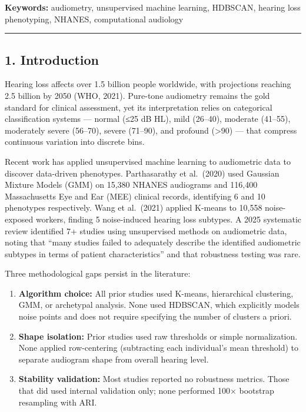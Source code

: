 \documentclass[
]{article}
\newcounter{none} %
\begin{document}
\textbf{Keywords:} audiometry, unsupervised machine learning, HDBSCAN, hearing
loss phenotyping, NHANES, computational audiology

\begin{center}\rule{0.5\linewidth}{0.5pt}\end{center}

\subsection{1. Introduction}\label{introduction}

Hearing loss affects over 1.5 billion people worldwide, with projections
reaching 2.5 billion by 2050 (WHO, 2021). Pure-tone audiometry remains the gold
standard for clinical assessment, yet its interpretation relies on categorical
classification systems --- normal (≤25 dB HL), mild (26--40), moderate (41--55),
moderately severe (56--70), severe (71--90), and profound (\textgreater90) ---
that compress continuous variation into discrete bins.

Recent work has applied unsupervised machine learning to audiometric data to
discover data-driven phenotypes. Parthasarathy et al.~(2020) used Gaussian
Mixture Models (GMM) on 15,380 NHANES audiograms and 116,400 Massachusetts Eye
and Ear (MEE) clinical records, identifying 6 and 10 phenotypes respectively.
Wang et al.~(2021) applied K-means to 10,558 noise-exposed workers, finding 5
noise-induced hearing loss subtypes. A 2025 systematic review identified 7+
studies using unsupervised methods on audiometric data, noting that ``many
studies failed to adequately describe the identified audiometric subtypes in
terms of patient characteristics'' and that robustness testing was rare.

Three methodological gaps persist in the literature:

\begin{enumerate}
\def\labelenumi{\arabic{enumi}.}
\item
  \textbf{Algorithm choice:} All prior studies used K-means, hierarchical
  clustering, GMM, or archetypal analysis. None used HDBSCAN, which explicitly
  models noise points and does not require specifying the number of clusters a
  priori.
\item
  \textbf{Shape isolation:} Prior studies used raw thresholds or simple
  normalization. None applied row-centering (subtracting each individual's mean
  threshold) to separate audiogram shape from overall hearing level.
\item
  \textbf{Stability validation:} Most studies reported no robustness metrics.
  Those that did used internal validation only; none performed 100× bootstrap
  resampling with ARI.
\end{enumerate}
\end{document}
